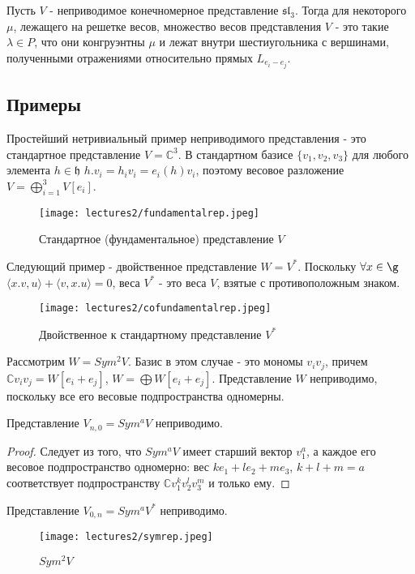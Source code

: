 \documentclass[a4article]{article}
\begin{document}
\begin{theorem}
    Пусть $V$ - неприводимое конечномерное представление $\mathfrak{sl}_3$. Тогда для некоторого $\mu$, лежащего на решетке весов, множество весов представления $V$ - это такие $\lambda \in P$, что они конгруэнтны $\mu$ и лежат внутри шестиугольника с вершинами, полученными отражениями относительно прямых $L_{e_i-e_j}$.
\end{theorem}

\subsection*{Примеры}

Простейший нетривиальный пример неприводимого представления - это стандартное представление $V = \mathbb{C}^3$. В стандартном базисе $\{v_1, v_2, v_3\}$ для любого элемента $h \in \mathfrak{h}$ $h.v_i = h_i v_i = e_i(h)v_i$, поэтому весовое разложение $V = \bigoplus_{i=1}^{3} V[e_i]$.
\begin{figure}[h!]
\centering
\texttt{[image: lectures2/fundamentalrep.jpeg]}
\caption{Стандартное (фундаментальное) представление $V$}
\label{fig:enter-label}
\end{figure}

Следующий пример - двойственное представление $W=V^*$. Поскольку $\forall x \in \g$ $\langle x.v, u \rangle + \langle v, x.u \rangle = 0$, веса $V^*$ - это веса $V$, взятые с противоположным знаком.
\begin{figure}[h!]
\centering
\texttt{[image: lectures2/cofundamentalrep.jpeg]}
\caption{Двойственное к стандартному представление $V^*$}
\label{fig:enter-label}
\end{figure}

Рассмотрим $W = Sym^2V$. Базис в этом случае - это мономы $v_i v_j$, причем $\mathbb{C}v_iv_j = W[e_i+e_j]$, $W = \bigoplus W[e_i+e_j]$. Представление $W$ неприводимо, поскольку все его весовые подпространства одномерны.

\begin{lemma}
    Представление $V_{n,0}=Sym^a V$ неприводимо.
\end{lemma}
\begin{proof}
    Следует из того, что $Sym^a V$ имеет старший вектор $v_1^a$, а каждое его весовое подпространство одномерно: вес $ke_1+le_2+me_3$, $k+l+m=a$ соответствует подпространству $\mathbb{C}v_1^kv_2^lv_3^m$ и только ему.
\end{proof}
\begin{corollary}
    Представление $V_{0,n}=Sym^a V^*$ неприводимо.
\end{corollary}
\begin{figure}[h!]
\centering
\texttt{[image: lectures2/symrep.jpeg]}
\caption{$Sym^2V$}
\label{fig:enter-label}
\end{figure}
\end{document}
